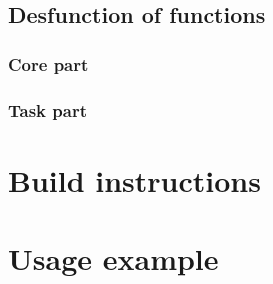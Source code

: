 \documentclass[a4paper,12pt]{article}
\begin{document}
\subsection{Desfunction of functions}
\subsubsection{Core part}
\subsubsection{Task part}

\section{Build instructions}

\section{Usage example}
\end{document}
